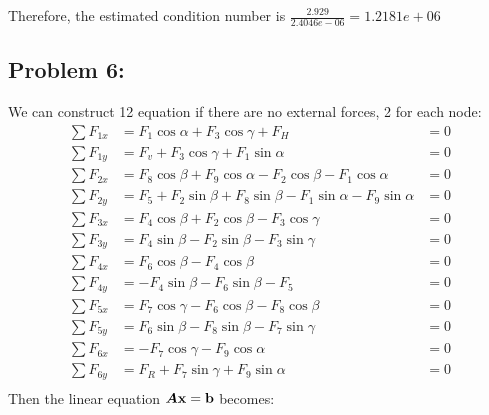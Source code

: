 \documentclass{article}
\begin{document}
Therefore, the estimated condition number is $\frac{2.929}{2.4046e-06} = 1.2181e+06$



\hypertarget{problem_0_homework_checklist_2}{}
\subsection*{{Problem 6: }}
\label{}

We can construct 12 equation if there are no external forces, 2 for each node: 
\begin{align*}
\sum F_{1x} &=F_1\cos\alpha + F_3\cos\gamma+F_H &= 0 \\
\sum F_{1y} &=F_v + F_3\cos\gamma + F_1\sin\alpha &= 0 \\
\sum F_{2x} &=F_8\cos\beta + F_9 \cos\alpha-F_2\cos\beta-F_1\cos\alpha &= 0 \\
\sum F_{2y} &=F_5+F_2\sin\beta+F_8\sin\beta-F_1\sin\alpha-F_9\sin\alpha &= 0 \\
\sum F_{3x} &=F_4\cos\beta+F_2\cos\beta-F_3\cos\gamma &= 0 \\
\sum F_{3y} &=F_4\sin\beta-F_2\sin\beta-F_3\sin\gamma &= 0 \\
\sum F_{4x} &=F_6\cos\beta - F_4\cos\beta &= 0 \\
\sum F_{4y} &=-F_4\sin\beta - F_6\sin\beta-F_5 &=0 \\
\sum F_{5x} &=F_7\cos\gamma - F_6\cos\beta -F_8\cos\beta &= 0 \\
\sum F_{5y} &=F_6\sin\beta-F_8\sin\beta-F_7\sin\gamma &= 0 \\
\sum F_{6x} &=-F_7\cos\gamma-F_9\cos\alpha &= 0 \\
\sum F_{6y} &=F_R+F_7\sin\gamma+F_9\sin\alpha &= 0 \\
\end{align*} 
Then the linear equation $\boldsymbol{A}\boldsymbol{\mathrm{x}}=\boldsymbol{\mathrm{b}}$ becomes: \\
\end{document}
